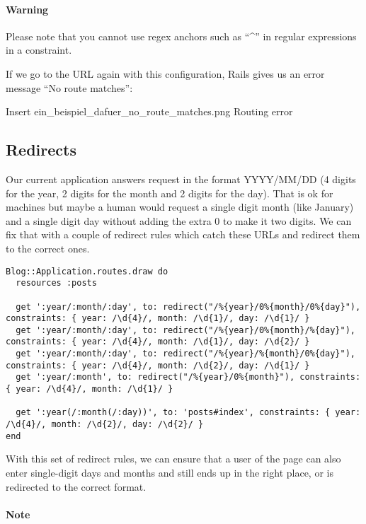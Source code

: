 \documentclass[a4paper]{book}
\begin{document}
\paragraph{Warning}\label{warning-10}

Please note that you cannot use regex anchors such as “\^{}” in regular expressions in a constraint.

If we go to the URL again with this configuration, Rails gives us an error message “No route matches”:

Insert ein\_beispiel\_dafuer\_no\_route\_matches.png Routing error

\subsection{Redirects}\label{redirects-1}

Our current application answers request in the format YYYY/MM/DD (4 digits for the year, 2 digits for the month and 2 digits for the day). That is ok for machines but maybe a human would request a single digit month (like January) and a single digit day without adding the extra 0 to make it two digits. We can fix that with a couple of redirect rules which catch these URLs and redirect them to the correct ones.

\begin{shaded}\begin{verbatim}
Blog::Application.routes.draw do
  resources :posts

  get ':year/:month/:day', to: redirect("/%{year}/0%{month}/0%{day}"), constraints: { year: /\d{4}/, month: /\d{1}/, day: /\d{1}/ }
  get ':year/:month/:day', to: redirect("/%{year}/0%{month}/%{day}"), constraints: { year: /\d{4}/, month: /\d{1}/, day: /\d{2}/ }
  get ':year/:month/:day', to: redirect("/%{year}/%{month}/0%{day}"), constraints: { year: /\d{4}/, month: /\d{2}/, day: /\d{1}/ }
  get ':year/:month', to: redirect("/%{year}/0%{month}"), constraints: { year: /\d{4}/, month: /\d{1}/ }

  get ':year(/:month(/:day))', to: 'posts#index', constraints: { year: /\d{4}/, month: /\d{2}/, day: /\d{2}/ }
end
\end{verbatim}\end{shaded}

With this set of redirect rules, we can ensure that a user of the page can also enter single-digit days and months and still ends up in the right place, or is redirected to the correct format.

\paragraph{Note}\label{note-36}
\end{document}
